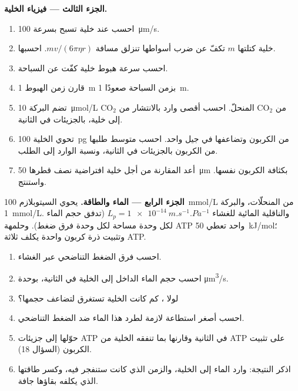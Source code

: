 \begin{problem}
\medskip
\noindent\textbf{الجزء الثالث --- فيزياء الخلية.}
\begin{enumerate}[resume]
  \item احسب  عند خلية تسبح بسرعة
        \qty{100}{\micro m/s}.
  \item خلية كتلتها $m$ تكفّ عن ضرب أسواطها تنزلق مسافة
        $mv/(6\pi\eta r)$. احسبها.
  \item احسب سرعة هبوط خلية كفّت عن السباحة.
  \item قارن زمن الهبوط \qty{1}{m} بزمن السباحة صعودًا
        \qty{1}{m}.
  \item تضم البركة \qty{10}{\micro mol/L} من
        $\mathrm{CO_2}$ المنحلّ. احسب أقصى وارد بالانتشار من
        $\mathrm{CO_2}$ إلى خلية، بالجزيئات في الثانية.
  \item تحوي الخلية \qty{100}{pg} من الكربون وتضاعفها في جيل
        واحد. احسب متوسط طلبها من الكربون بالجزيئات في الثانية،
        ونسبة الوارد إلى الطلب.
  \item أعد المقارنة من أجل خلية افتراضية نصف قطرها
        \qty{50}{\micro m} بكثافة الكربون نفسها. واستنتج.
\end{enumerate}

\medskip
\noindent\textbf{الجزء الرابع --- الماء والطاقة.}
يحوي السيتوبلازم \qty{100}{mmol/L} من المنحلّات، والبركة
\qty{1}{mmol/L}. والناقلية المائية للغشاء $L_p =
\qty{1e-14}{m.s^{-1}.Pa^{-1}}$ (تدفق حجم الماء لكل وحدة مساحة لكل
وحدة فرق ضغط). وحلمهة ATP واحد تعطي
\qty{50}{kJ/mol}؛ وتثبيت ذرة كربون واحدة يكلف ثلاثة ATP.
\begin{enumerate}[resume]
  \item احسب فرق الضغط التناضحي عبر الغشاء.
  \item احسب حجم الماء الداخل إلى الخلية في الثانية، بوحدة
        \unit{\micro m^3/s}.
  \item لولا ، كم كانت الخلية تستغرق لتضاعف حجمها؟
  \item احسب أصغر استطاعة لازمة لطرد هذا الماء ضد الضغط التناضحي.
  \item حوّلها إلى جزيئات ATP في الثانية وقارنها بما تنفقه الخلية
        من ATP على تثبيت الكربون (السؤال 18).
  \item اذكر النتيجة: وارد الماء إلى الخلية، والزمن الذي كانت
        ستنفجر فيه، وكسر طاقتها الذي يكلفه بقاؤها جافة.
\end{enumerate}
\end{problem}
